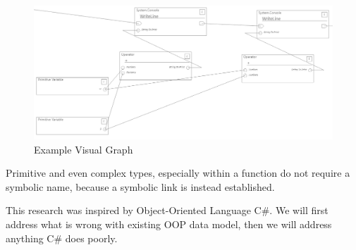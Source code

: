 \documentclass{article}
\begin{document}
\begin{figure}[H]
    \centering
    \includegraphics[width=1\textwidth]{exampl1.PNG}
    \caption{Example Visual Graph}
    \label{fig:exampl1}
\end{figure}

Primitive and even complex types, especially within a function do not require a symbolic name, because a symbolic link is instead established. 

This research was inspired by Object-Oriented Language C\#. We will first address what is wrong with existing OOP data model, then we will address anything C\# does poorly.
\end{document}
